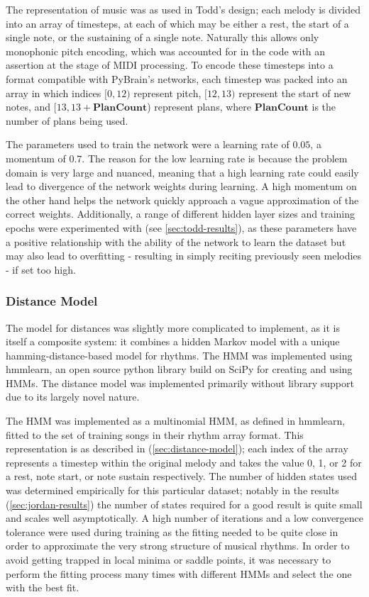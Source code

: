 \documentclass[ author={Stephen Livermore-Tozer},
				supervisor={Dr. Peter Flach},
				degree={MEng},
				title={Algorithmic Co-composition Using Machine Learning},
				subtitle={},
				type={research},
				year={2016} ]{dissertation}
\begin{document}
	The representation of music was as used in Todd's design; each melody is divided into an array of timesteps, at each of which may be either a rest, the start of a single note, or the sustaining of a single note. Naturally this allows only monophonic pitch encoding, which was accounted for in the code with an assertion at the stage of MIDI processing. To encode these timesteps into a format compatible with PyBrain's networks, each timestep was packed into an array in which indices $[0,12)$ represent pitch, $[12,13)$ represent the start of new notes, and $[13,13+\mathbf{PlanCount}$) represent plans, where $\mathbf{PlanCount}$ is the number of plans being used.
	
	The parameters used to train the network were a learning rate of $0.05$, a momentum of $0.7$. The reason for the low learning rate is because the problem domain is very large and nuanced, meaning that a high learning rate could easily lead to divergence of the network weights during learning. A high momentum on the other hand helps the network quickly approach a vague approximation of the correct weights. Additionally, a range of different hidden layer sizes and training epochs were experimented with (see \ref{sec:todd-results}), as these parameters have a positive relationship with the ability of the network to learn the dataset but may also lead to overfitting - resulting in simply reciting previously seen melodies - if set too high.
	
	\subsubsection{Distance Model}
	
	The model for distances was slightly more complicated to implement, as it is itself a composite system: it combines a hidden Markov model with a unique hamming-distance-based model for rhythms. The HMM was implemented using hmmlearn, an open source python library build on SciPy for creating and using HMMs. The distance model was implemented primarily without library support due to its largely novel nature. 
	
	The HMM was implemented as a multinomial HMM, as defined in hmmlearn, fitted to the set of training songs in their rhythm array format. This representation is as described in (\ref{sec:distance-model}); each index of the array represents a timestep within the original melody and takes the value 0, 1, or 2 for a rest, note start, or note sustain respectively. The number of hidden states used was determined empirically for this particular dataset; notably in the results (\ref{sec:jordan-results}) the number of states required for a good result is quite small and scales well asymptotically. A high number of iterations and a low convergence tolerance were used during training as the fitting needed to be quite close in order to approximate the very strong structure of musical rhythms. In order to avoid getting trapped in local minima or saddle points, it was necessary to perform the fitting process many times with different HMMs and select the one with the best fit.
	
\end{document}
